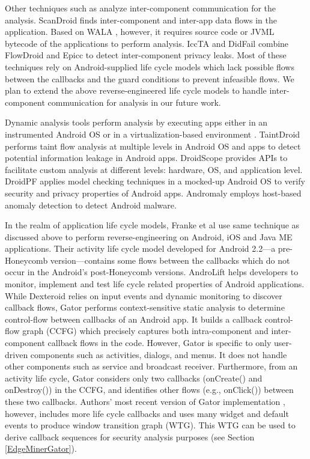 \documentclass[10pt]{elsarticle}
\begin{document}
Other techniques such as \cite{myDroid, ICCTAFD, cmuICCTA, AppIntent, ICCDamien} analyze inter-component communication for the analysis. ScanDroid \cite{myDroid} finds inter-component and inter-app data flows in the application. Based on WALA \cite{WALA}, however, it requires source code or JVML bytecode of the applications to perform analysis. IccTA \cite{ICCTAFD} and DidFail \cite{cmuICCTA} combine FlowDroid \cite{FlowDroid} and Epicc \cite{Epicc} to detect inter-component privacy leaks. Most of these techniques rely on Android-supplied life cycle models which lack possible flows between the callbacks and the guard conditions to prevent infeasible flows. We plan to extend the above reverse-engineered life cycle models to handle inter-component communication for analysis in our future work.

Dynamic analysis tools perform analysis by executing apps either in an instrumented Android OS \cite{TaintDroid, VetDroid} or in a virtualization-based environment \cite{DroidScope, DroidPF, DroidBox}. TaintDroid \cite{TaintDroid} performs taint flow analysis at multiple levels in Android OS and apps to detect potential information leakage in Android apps. DroidScope \cite{DroidScope} provides APIs to facilitate custom analysis at different levels: hardware, OS, and application level. DroidPF \cite{DroidPF} applies model checking techniques in a mocked-up Android OS to verify security and privacy properties of Android apps. Andromaly \cite{Andromaly} employs host-based anomaly detection to detect Android malware. 

In the realm of application life cycle models, Franke et al \cite{Franke2011, serviceLCMFrank} use same technique as discussed above to perform reverse-engineering on Android, iOS and Java ME applications. Their activity life cycle model developed for Android 2.2---a pre-Honeycomb version---contains some flows between the callbacks which do not occur in the Android's post-Honeycomb versions. AndroLift \cite{AndroLift} helps developers to monitor, implement and test life cycle related properties of Android applications. While Dexteroid relies on input events and dynamic monitoring to discover callback flows, Gator \cite{GatorICSE} performs context-sensitive static analysis to determine control-flow between callbacks of an Android app. It builds a callback control-flow graph (CCFG) which precisely captures both intra-component and inter-component callback flows in the code. However, Gator is specific to only user-driven components such as activities, dialogs, and menus. It does not handle other components such as service and broadcast receiver. Furthermore, from an activity life cycle, Gator considers only two callbacks ({\ttfamily onCreate()} and {\ttfamily onDestroy()}) in the CCFG, and identifies other flows (e.g., {\ttfamily onClick()}) between these two callbacks. Authors' most recent version of Gator implementation \cite{GATORWTG}, however, includes more life cycle callbacks and uses many widget and default events to produce window transition graph (WTG). This WTG can be used to derive callback sequences for security analysis purposes (see Section \ref{EdgeMinerGator}).
\end{document}
